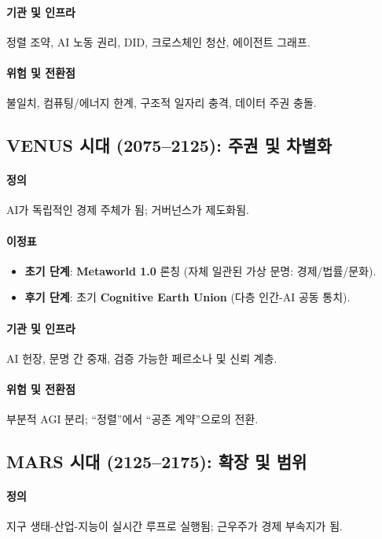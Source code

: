 \documentclass[11pt]{article}
\begin{document}
\paragraph{기관 및 인프라} 정렬 조약, AI 노동 권리, DID, 크로스체인 청산, 에이전트 그래프.

\paragraph{위험 및 전환점} 불일치, 컴퓨팅/에너지 한계, 구조적 일자리 충격, 데이터 주권 충돌.

\subsection{VENUS 시대 (2075–2125): 주권 및 차별화}
\paragraph{정의} AI가 독립적인 경제 주체가 됨; 거버넌스가 제도화됨.

\paragraph{이정표}
\begin{itemize}[noitemsep]
  \item \textbf{초기 단계}: \textbf{Metaworld 1.0} 론칭 (자체 일관된 가상 문명: 경제/법률/문화).
  \item \textbf{후기 단계}: 초기 \textbf{Cognitive Earth Union} (다층 인간-AI 공동 통치).
\end{itemize}

\paragraph{기관 및 인프라} AI 헌장, 문명 간 중재, 검증 가능한 페르소나 및 신뢰 계층.

\paragraph{위험 및 전환점} 부분적 AGI 분리; ``정렬''에서 ``공존 계약''으로의 전환.

\subsection{MARS 시대 (2125–2175): 확장 및 범위}
\paragraph{정의} 지구 생태-산업-지능이 실시간 루프로 실행됨; 근우주가 경제 부속지가 됨.
\end{document}
